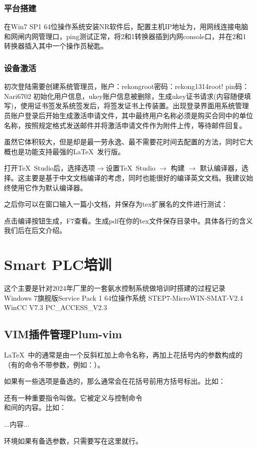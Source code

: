 \subsubsection{平台搭建}
在Win7 SP1 64位操作系统安装NR软件后，配置主机IP地址为，用网线连接电脑和网闸内网管理口，ping测试正常，将2和1转换器插到内网console口，并在2和1转换器插入其中一个操作员秘匙。
\subsubsection{设备激活}
初次登陆需要创建系统管理员，账户：rekongroot密码：rekong1314root! pin码：Nari6702
初始化用户信息，ukey账户信息被删除，生成ukey证书请求(内容随便填写)，使用证书签发系统签发后，将签发证书上传装置。出现登录界面用系统管理员账户登录后开始生成激活申请文件，其中最终用户名称必须是购买合同中的单位名称，按照规定格式发送邮件并将激活申请文件作为附件上传，等待邮件回复。


虽然它体积较大，但是却是最一劳永逸、最不需要花时间去配置的方法，同时它大概也是功能支持最强的\LaTeX\ 发行版。

打开\TeX\ Studio后，选择选项$\rightarrow$设置\TeX\ Studio $\rightarrow$ 构建 $\rightarrow$ 默认编译器，选择\xelatex{}。这主要是基于中文文档编译的考虑，同时\xelatex 也能很好的编译英文文档。我建议始终使用它作为默认编译器。


之后你可以在窗口输入一篇小文档，并保存为tex扩展名的文件进行测试：
点击编译按钮生成，F7查看。生成pdf在你的tex文件保存目录中。具体各行的含义我们后在后文介绍。

\section{Smart PLC培训}
这个主要是针对2024年厂里的一套氨水控制系统做培训时搭建的过程记录
Windows 7旗舰版Service Pack 1 64位操作系统
STEP7-MicroWIN-SMAT-V2.4
WinCC V7.3
PC\_ACCESS\_V2.3
\subsection{VIM插件管理Plum-vim}
\LaTeX\ 中的通常是由一个反斜杠加上命令名称，再加上花括号内的参数构成的（有的命令不带参数，例如：）。
如果有一些选项是备选的，那么通常会在花括号前用方括号标出。比如：
还有一种重要指令叫做。它被定义与控制命令\\和间的内容。比如：%
\begin{latex}

...内容...

\end{latex}
环境如果有备选参数，只需要写在这里就行。

